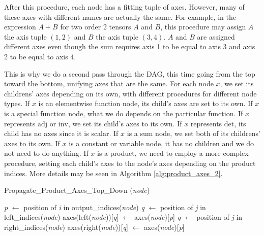\documentclass[12pt, a4paper]{report}
\begin{document}
After this procedure, each node has a fitting tuple of axes.
However, many of these axes with different names are actually the same.
For example, in the expression $A + B$ for two order 2 tensors $A$ and $B$, this procedure may assign $A$ the axis tuple $(1,2)$ and $B$ the axis tuple $(3,4)$.
$A$ and $B$ are assigned different axes even though the sum requires axis 1 to be equal to axis 3 and axis 2 to be equal to axis 4.

This is why we do a second pass through the DAG, this time going from the top toward the bottom, unifying axes that are the same.
For each node $x$, we set its childrens' axes depending on its own, with different procedures for different node types.
If $x$ is an elementwise function node, its child's axes are set to its own.
If $x$ is a special function node, what we do depends on the particular function.
If $x$ represents $\text{adj}$ or $\text{inv}$, we set its child's axes to its own.
If $x$ represents $\text{det}$, its child has no axes since it is scalar.
If $x$ is a sum node, we set both of its childrens' axes to its own.
If $x$ is a constant or variable node, it has no children and we do not need to do anything.
If $x$ is a product, we need to employ a more complex procedure, setting each child's axes to the node's axes depending on the product indices.
More details may be seen in Algorithm \ref{alg:product_axes_2}.

\begin{algorithm}
    \caption{Propagate\_Product\_Axes\_Top\_Down (\textit{node})}
    \label{alg:product_axes_2}
    \begin{algorithmic}
            \State \textit{p} $\gets$ position of \textit{i} in output\_indices(\textit{node})
                \State \textit{q} $\gets$ position of \textit{j} in left\_indices(\textit{node})
                    \State axes(left(\textit{node}))[\textit{q}] $\gets$ axes(\textit{node})[\textit{p}]
                \EndIf
            \EndFor
                \State \textit{q} $\gets$ position of \textit{j} in right\_indices(\textit{node})
                    \State axes(right(\textit{node}))[\textit{q}] $\gets$ axes(\textit{node})[\textit{p}]
                \EndIf
            \EndFor
        \EndFor
    \end{algorithmic}
\end{algorithm}
\end{document}
